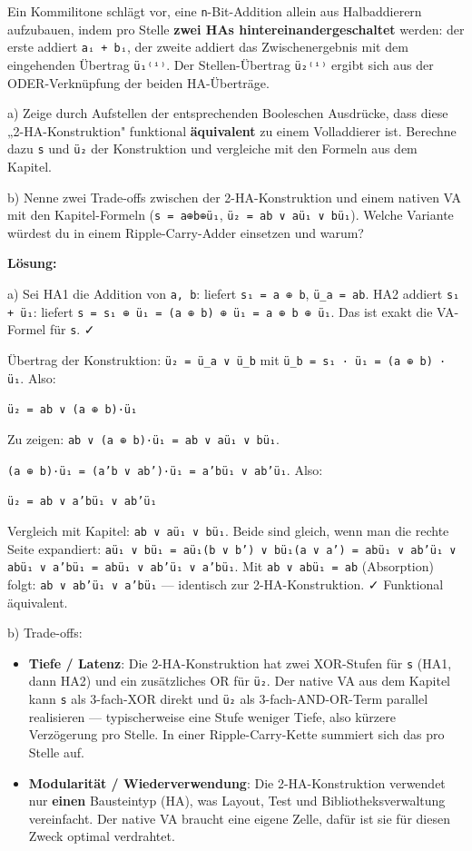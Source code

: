 \documentclass[11pt, a4paper]{article}
\begin{document}
Ein Kommilitone schlägt vor, eine \texttt{n}-Bit-Addition allein aus Halbaddierern aufzubauen, indem pro Stelle \textbf{zwei HAs hintereinandergeschaltet} werden: der erste addiert \texttt{aᵢ + bᵢ}, der zweite addiert das Zwischenergebnis mit dem eingehenden Übertrag \texttt{ü₁⁽ⁱ⁾}. Der Stellen-Übertrag \texttt{ü₂⁽ⁱ⁾} ergibt sich aus der ODER-Verknüpfung der beiden HA-Überträge.


a) Zeige durch Aufstellen der entsprechenden Booleschen Ausdrücke, dass diese „2-HA-Konstruktion" funktional \textbf{äquivalent} zu einem Volladdierer ist. Berechne dazu \texttt{s} und \texttt{ü₂} der Konstruktion und vergleiche mit den Formeln aus dem Kapitel.


b) Nenne zwei Trade-offs zwischen der 2-HA-Konstruktion und einem nativen VA mit den Kapitel-Formeln (\texttt{s = a⊕b⊕ü₁}, \texttt{ü₂ = ab ∨ aü₁ ∨ bü₁}). Welche Variante würdest du in einem Ripple-Carry-Adder einsetzen und warum?


\textbf{Lösung:}


a) Sei HA1 die Addition von \texttt{a, b}: liefert \texttt{s₁ = a ⊕ b}, \texttt{ü\_a = ab}. HA2 addiert \texttt{s₁ + ü₁}: liefert \texttt{s = s₁ ⊕ ü₁ = (a ⊕ b) ⊕ ü₁ = a ⊕ b ⊕ ü₁}. Das ist exakt die VA-Formel für \texttt{s}. ✓


Übertrag der Konstruktion: \texttt{ü₂ = ü\_a ∨ ü\_b} mit \texttt{ü\_b = s₁ · ü₁ = (a ⊕ b) · ü₁}. Also:


\texttt{ü₂ = ab ∨ (a ⊕ b)·ü₁}


Zu zeigen: \texttt{ab ∨ (a ⊕ b)·ü₁ = ab ∨ aü₁ ∨ bü₁}.


\texttt{(a ⊕ b)·ü₁ = (a'b ∨ ab')·ü₁ = a'bü₁ ∨ ab'ü₁}. Also:


\texttt{ü₂ = ab ∨ a'bü₁ ∨ ab'ü₁}


Vergleich mit Kapitel: \texttt{ab ∨ aü₁ ∨ bü₁}. Beide sind gleich, wenn man die rechte Seite expandiert: \texttt{aü₁ ∨ bü₁ = aü₁(b ∨ b') ∨ bü₁(a ∨ a') = abü₁ ∨ ab'ü₁ ∨ abü₁ ∨ a'bü₁ = abü₁ ∨ ab'ü₁ ∨ a'bü₁}. Mit \texttt{ab ∨ abü₁ = ab} (Absorption) folgt: \texttt{ab ∨ ab'ü₁ ∨ a'bü₁} — identisch zur 2-HA-Konstruktion. ✓ Funktional äquivalent.


b) Trade-offs:


\begin{itemize}
  \item \textbf{Tiefe / Latenz}: Die 2-HA-Konstruktion hat zwei XOR-Stufen für \texttt{s} (HA1, dann HA2) und ein zusätzliches OR für \texttt{ü₂}. Der native VA aus dem Kapitel kann \texttt{s} als 3-fach-XOR direkt und \texttt{ü₂} als 3-fach-AND-OR-Term parallel realisieren — typischerweise eine Stufe weniger Tiefe, also kürzere Verzögerung pro Stelle. In einer Ripple-Carry-Kette summiert sich das pro Stelle auf.
  \item \textbf{Modularität / Wiederverwendung}: Die 2-HA-Konstruktion verwendet nur \textbf{einen} Bausteintyp (HA), was Layout, Test und Bibliotheksverwaltung vereinfacht. Der native VA braucht eine eigene Zelle, dafür ist sie für diesen Zweck optimal verdrahtet.
\end{itemize}
\end{document}
